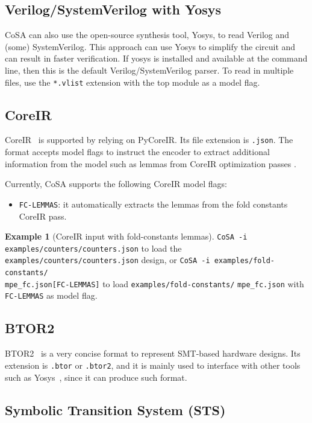 \documentclass{article}
\theoremstyle{definition}
\newtheorem{example}{Example}[section]
\begin{document}
\subsection{Verilog/SystemVerilog with Yosys}
CoSA can also use the open-source synthesis tool, Yosys, to read Verilog and
(some) SystemVerilog. This approach can use Yosys to simplify the circuit and
can result in faster verification. If yosys is installed and available at the
command line, then this is the default Verilog/SystemVerilog parser. To read in
multiple files, use the \texttt{*.vlist} extension with the top module as a
model flag.

\subsection{CoreIR}
CoreIR~\cite{CoreIR} is supported by relying on PyCoreIR. Its file
extension is \texttt{.json}. The format accepts model flags to
instruct the encoder to extract additional information from the model
such as lemmas from CoreIR optimization passes \cite{cosa-paper}.

Currently, CoSA supports the following CoreIR model flags:
\begin{itemize}
\item \texttt{FC-LEMMAS}: it automatically extracts the lemmas from
  the fold constants CoreIR pass.
\end{itemize}

\begin{example}[CoreIR input with fold-constants lemmas]
  \texttt{CoSA -i examples/counters/counters.json} to load the
  \texttt{examples/counters/counters.json} design, or \texttt{CoSA -i
    examples/fold-constants/\\mpe\_fc.json[FC-LEMMAS]} to load
  \texttt{examples/fold-constants/} \texttt{mpe\_fc.json} with
  \texttt{FC-LEMMAS} as model flag.
\end{example}

\subsection{BTOR2}
BTOR2~\cite{btormc} is a very concise format to represent SMT-based
hardware designs. Its extension is \texttt{.btor} or \texttt{.btor2},
and it is mainly used to interface with other tools such as
Yosys~\cite{wolf2013yosys}, since it can produce such format.

\subsection{Symbolic Transition System (STS)}
\end{document}
